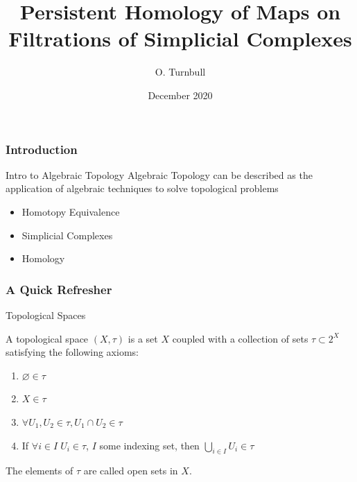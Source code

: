 \documentclass{beamer}
\theoremstyle{definition}
\numberwithin{theorem}{section}
\begin{document}
\title[Persistent Homology]{Persistent Homology of Maps on Filtrations of Simplicial Complexes}
\author{O. Turnbull}
\date{December 2020}
\begin{frame}\titlepage
\end{frame}

\begin{frame}
\frametitle{Introduction}
\begin{block}{Intro to Algebraic Topology}
Algebraic Topology can be described as the application of algebraic techniques to solve topological problems
\begin{itemize}
\item{Homotopy Equivalence}
\item{Simplicial Complexes}
\item{Homology}
\end{itemize}
\end{block}
\end{frame}

\begin{frame}
\frametitle{A Quick Refresher}
\begin{block}{Topological Spaces}
\begin{definition}
A topological space $(X, \tau )$ is a set $X$ coupled with a collection of sets $\tau \subset 2^{X}$ satisfying the following axioms:

\begin{enumerate}
\item{$\varnothing \in \tau$}
\item{$X \in \tau$}
\item{$\forall U_1, U_2 \in \tau, U_1 \cap U_2 \in \tau$}
\item{ If $\forall i \in I \; U_i \in \tau $, $I$ some indexing set, then $\bigcup_{i \in I} U_i \in \tau$}
\end{enumerate}
\end{definition}
The elements of $\tau$ are called open sets in $X$.
\end{block}
\end{frame}
\end{document}
